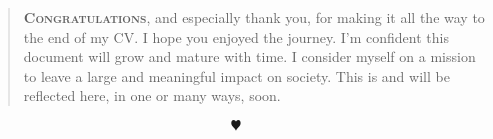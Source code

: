 \vspace{0.1cm}
\begin{quote}
  \textbf{\textsc{Congratulations}}, and especially thank you, for making it all the way to the end of my CV. I hope you enjoyed the journey. I'm confident this document will grow and mature with time. I consider myself on a mission to leave a large and meaningful impact on society. This is and will be reflected here, in one or many ways, soon.
\end{quote}

$$\varheart$$


